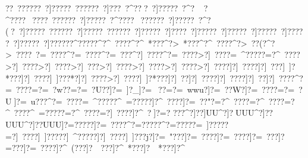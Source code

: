 {{{{{{{{{{{{{{{{{{{{{{{{{{{{{{{{{{{{{{{{{{{{{{{{{{{{{{{{{{{{{{{{{{{{{{{{{{{{{{{{{{{{{{{{{{{{{{{{{{{{{{{{{{{{{{{{{{{{{{{{{{{{{{{{{{{{{{{{{{{{{{{{{{{{{{{{{{{{{{{{{{{{{{{{{{{{{{{{{{{{{{{{{{{{{{{{{{{{{{{{{{{{{{{{{{{{{{{{{{{{{{{{{{{{{{{{{{{{{{{{{{{{{{{{{{{{{{{{{{{{{{{{{{{{{{{{{{{{{{{{{{{{{{{{{{{{{{{{{{{{{{{{{{{{{{{{{{{{{{{{{{{{{{{{{{{{{{{{{{{{{{{{{{{{{{{{{{{{{{{{{{{{{{{{{{{{{{{{{{{{{{{{{{{{{{{{{{{{{{{{{{{{{{{{{{{{{{{{{{{{{{{{{{{{{{{{{{{{{{{{{{{{{{{{{{{{{{{{{{{{{{{{{{{{{{{{{{{{{{{{{{{{{{{{{{{{{{{{{{{{{{{{{{{{{{{{{{{{{{{{{{{{{{{{{{{{{{{{{{{{{{{{{{{{{{{{{{{{{{{{{{{{{{{{{{{{{{{{{{{{{{{{{{{{{{{{{{{{{{{{{{{{{{{{{{{{{{{{{{{{{{{{{{{{{{{{{{{{{{{{{{{{{{{{{{{{{{{{{{{{{{{{{{{{{{{{{{{{{{{{{{{{{{{{{{{{{{{{{{{{{{{{{{{{{{{{{{{{{{{{{{{{{{{{{{{{{{{{{{{{{{{{{{{{{{{{{{{{{{{{{{{{{{{{{{{{{{{{{{{{{{{{{{{{{{{{{{{{{{{{{{{{{{{{{{{{{{{{{{{{{{{{{{{{{{{{{{{{{{{{{{{{{{{{{{{{{{{{{{{{{{{{{{{{{{{{{{{{{{{{{{{{{{{{{{{{{{{{{{{{{{{{{{{{{{{{{{{{{{{{{{{{{{{{{{{{{{{{{{{{{{{{{{{{{{{{{{{{{{{{{{{{{{{{{{{{{{{{{{{{{{{{{{{{{{{{{{{{{{{{{{{{{{{{{{{{{{{{{{{{{{{{{{{{{{{{{{{{{{{{{{{{{{{{{{{{{{{{{{{{{{{{{{{{{{{{{{{{{{{{{{{{{{{{{{{{{{{{{{{{{{{{{{{{{{{{{{{{{{{{{{{{{{{{{{{{{{{{{{{{{{{{{{{{{{{{{{{{{{{{{{{{{{{{{{{{{{{{{{{{{{{{{{{{{{{{{{{{{{{{{{{{{{{{{{{{{{{{{{{{{{{{{{{{{{{{{{{{{{{{{{{{{{{{{{{{{{{{{{{{{{{{{{{{{{{{{{{{{{{{{{{{{{{{{{{{{{{{{{{{{{{{{{{{{{{{{{{{{{{{{{{{{{{{{{{{{{{{{{{{{??~?}?????~?]?????~?}?????~?]???~?^?? ?~?]?????~?^?   ~?^????~?}???~?}?????~?]?????~?^????~?}?????~?]?????~?^?( ?~?]?????~?}?????~?]?????~?}?????~?]?????~?]????~?]?????~?]?????~?]?????~?]?????~?]?????~?]?????}?^?????^?^~????^?^~*???^?>~*???^?^~????^?>~??(?^?>~????~?=~????^?=~????^?=~???^?]~????^?=~????>?]~????=~^?????=?^~????>?]~????>?]~????>?]~???>?]~????>?]~????>?]~????>?]~????]?]~????]?]~???]~]?*???]?]~????]~]???*?]?]~????>?]~????]~]?*???]?]~??]?]~????]?]~????]?]~??]?]~????^?=~????=?=~?w??=?=~?U??]?=~}]?_]?=~}??=?=~wwu?]?=~??W?]?=~????=?=~}?U]?=~u???^?=~????=~^?????^~=?????]?^~????]?=~??"?=?^~????=?^~????=?^~????^~=?????=?^~????=?]~????]?^~?  ]?=?
???^?]??]UU^?]?UUU^?]??UUU^?]??UUU]?=?????]?=~????^?=?????^?=?????=~]?????=?]~????]~]?????]~^?????]?]~????]~]???j?]?=~"???]?=~????]?=~????]?=~ ???]?=?  ??]?=~????]?^~(???]?~~ ???]?^~*???]?~~*???]?^~  }}}}}}}}}}}}}}}}}}}}}}}}}}}}}}}}}}}}}}}}}}}}}}}}}}}}}}}}}}}}}}}}}}}}}}}}}}}}}}}}}}}}}}}}}}}}}}}}}}}}}}}}}}}}}}}}}}}}}}}}}}}}}}}}}}}}}}}}}}}}}}}}}}}}}}}}}}}}}}}}}}}}}}}}}}}}}}}}}}}}}}}}}}}}}}}}}}}}}}}}}}}}}}}}}}}}}}}}}}}}}}}}}}}}}}}}}}}}}}}}}}}}}}}}}}}}}}}}}}}}}}}}}}}}}}}}}}}}}}}}}}}}}}}}}}}}}}}}}}}}}}}}}}}}}}}}}}}}}}}}}}}}}}}}}}}}}}}}}}}}}}}}}}}}}}}}}}}}}}}}}}}}}}}}}}}}}}}}}}}}}}}}}}}}}}}}}}}}}}}}}}}}}}}}}}}}}}}}}}}}}}}}}}}}}}}}}}}}}}}}}}}}}}}}}}}}}}}}}}}}}}}}}}}}}}}}}}}}}}}}}}}}}}}}}}}}}}}}}}}}}}}}}}}}}}}}}}}}}}}}}}}}}}}}}}}}}}}}}}}}}}}}}}}}}}}}}}}}}}}}}}}}}}}}}}}}}}}}}}}}}}}}}}}}}}}}}}}}}}}}}}}}}}}}}}}}}}}}}}}}}}}}}}}}}}}}}}}}}}}}}}}}}}}}}}}}}}}}}}}}}}}}}}}}}}}}}}}}}}}}}}}}}}}}}}}}}}}}}}}}}}}}}}}}}}}}}}}}}}}}}}}}}}}}}}}}}}}}}}}}}}}}}}}}}}}}}}}}}}}}}}}}}}}}}}}}}}}}}}}}}}}}}}}}}}}}}}}}}}}}}}}}}}}}}}}}}}}}}}}}}}}}}}}}}}}}}}}}}}}}}}}}}}}}}}}}}}}}}}}}}}}}}}}}}}}}}}}}}}}}}}}}}}}}}}}}}}}}}}}}}}}}}}}}}}}}}}}}}}}}}}}}}}}}}}}}}}}}}}}}}}}}}}}}}}}}}}}}}}}}}}}}}}}}}}}}}}}}}}}}}}}}}}}}}}}}}}}}}}}}}}}}}}}}}}}}}}}}}}}}}}}}}}}}}}}}}}}}}}}}}}}}}}}}}}}}}}}}}}}}}}}}}}}}}}}}}}}}}}}}}}}}}}}}}}}}}}}}}}}}}}}}}}}}}}}}}}}}}}}}}}}}}}}}}}}}}}}}}}}}}}}}}}}}}}}}}}}}}}}}}}}}}}}}}}}}}}}}}}}}}}}}}}}}}}}}}}}}}}}}}}}}}}}}}}}}}}}}}}}}}}}}}}}}}}}}}}}}}}}}}}}}}}}}}}}}}}}}}}}}}}}}}}}}}}}}}}}}}}}}}}}}}}}}}}}}}}}}}}}}}}}}}}}}}}}}}}}}}}}}}}}}}}}}}}
